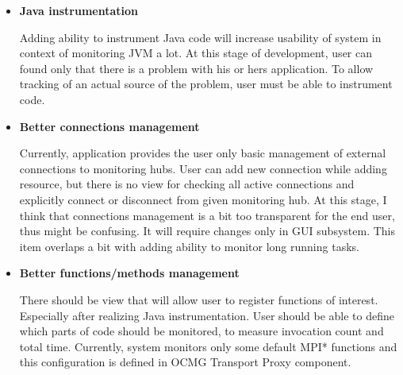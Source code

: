 \begin{itemize}
\item {\bf Java instrumentation}

Adding ability to instrument Java code will increase usability of system in context of monitoring JVM a lot. At this stage of development, user can found only that there is a problem with his or hers application. To allow tracking of an actual source of the problem, user must be able to instrument code.      
     
\item {\bf Better connections management}

Currently, application provides the user only basic management of external connections to monitoring hubs. User can add new connection while adding resource, but there is no view for checking all active connections and explicitly connect or disconnect from given monitoring hub. At this stage, I think that connections management is a bit too transparent for the end user, thus might be confusing. It will require changes only in GUI subsystem. This item overlaps a bit with adding ability to monitor long running tasks.

\item{\bf Better functions/methods management}

There should be view that will allow user to register functions of interest. Especially after realizing Java instrumentation. User should be able to define which parts of code should be monitored, to measure invocation count and total time. Currently, system monitors only some default MPI* functions and this configuration is defined in OCMG Transport Proxy component.

\end{itemize}